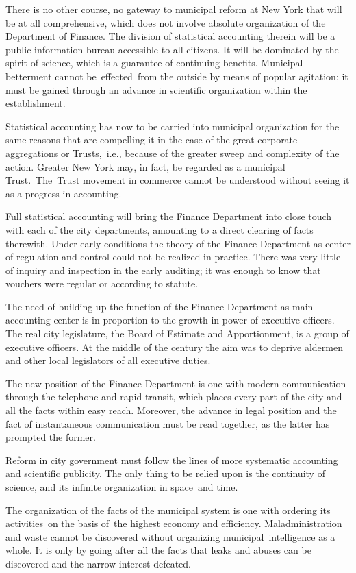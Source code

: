 \documentclass[openany,nobib]{tufte-book}
\begin{document}
There is no other course, no gateway to municipal reform at New York
that will be at all comprehensive, which does not involve absolute
organization of the Department of Finance. The division of statistical
accounting therein will be a public information bureau accessible to all
citizens. It will be dominated by the spirit of science, which is a
guarantee of continuing benefits. Municipal betterment cannot
be~effected~from the outside by means of popular agitation; it must be
gained through an advance in scientific organization within the
establishment.~

Statistical accounting has now to be carried into municipal organization
for the same reasons that are compelling it in the case of the great
corporate aggregations or Trusts,~i.e., because of the greater sweep and
complexity of the action. Greater New York may, in fact, be regarded as
a municipal Trust.~The~Trust movement in commerce cannot be understood
without seeing it as a progress in accounting.~

Full statistical accounting will bring the Finance Department into close
touch with each of the city departments, amounting to a direct clearing
of facts therewith. Under early conditions the theory of the Finance
Department as center of regulation and control could not be realized in
practice. There was very little of inquiry and inspection in the early
auditing; it was enough to know that vouchers were regular or according
to statute.~

The need of building up the function of the Finance Department as main
accounting center is in proportion to the growth in power of executive
officers. The real city legislature, the Board of Estimate and
Apportionment, is a group of executive officers. At the middle of the
century the aim was to deprive aldermen and other local legislators of
all executive duties.~

The new position of the Finance Department is one with modern
communication through the telephone and rapid transit, which places
every part of the city and all the facts within easy reach. Moreover,
the advance in legal position and the fact of instantaneous
communication must be read together, as the latter has prompted the
former.~~

Reform in city government must follow the lines of more systematic
accounting and scientific publicity. The only thing to be relied upon is
the continuity of science, and its infinite organization in space~and
time.~

The organization of the facts of the municipal system is one with
ordering its activities~on the basis of~the highest economy and
efficiency. Maladministration and waste cannot be discovered without
organizing municipal~intelligence as a whole. It is only by going after
all the facts that leaks and abuses can be discovered and the narrow
interest defeated.~
\end{document}
